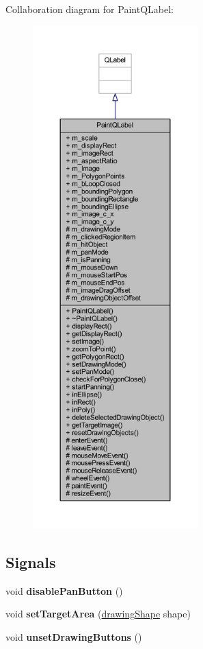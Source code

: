 Collaboration diagram for Paint\+Q\+Label\+:
\nopagebreak
\begin{figure}[H]
\begin{center}
\leavevmode
\includegraphics[height=550pt]{class_paint_q_label__coll__graph}
\end{center}
\end{figure}
\subsection*{Signals}
\begin{DoxyCompactItemize}
\item 
\mbox{\label{class_paint_q_label_aef10b2d14a17cf5b838106d076fdfce4}} 
void {\bfseries disable\+Pan\+Button} ()
\item 
\mbox{\label{class_paint_q_label_a0aabd575fa4e3774689bbc0aafdc6fdb}} 
void {\bfseries set\+Target\+Area} (\hyperlink{structdrawing_shape}{drawing\+Shape} shape)
\item 
\mbox{\label{class_paint_q_label_a84be2f2ab4315ae3d0d128c648d9933b}} 
void {\bfseries unset\+Drawing\+Buttons} ()
\end{DoxyCompactItemize}
